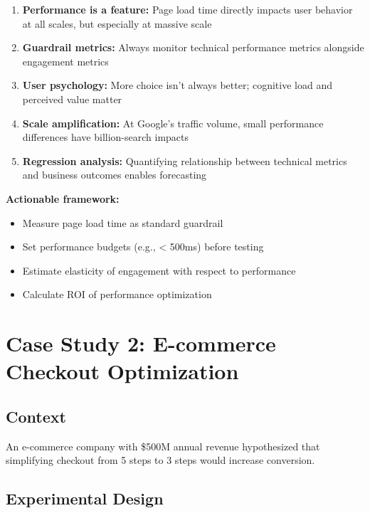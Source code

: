 \begin{enumerate}
    \item \textbf{Performance is a feature:} Page load time directly impacts user behavior at all scales, but especially at massive scale

    \item \textbf{Guardrail metrics:} Always monitor technical performance metrics alongside engagement metrics

    \item \textbf{User psychology:} More choice isn't always better; cognitive load and perceived value matter

    \item \textbf{Scale amplification:} At Google's traffic volume, small performance differences have billion-search impacts

    \item \textbf{Regression analysis:} Quantifying relationship between technical metrics and business outcomes enables forecasting
\end{enumerate}

\textbf{Actionable framework:}
\begin{itemize}
    \item Measure page load time as standard guardrail
    \item Set performance budgets (e.g., < 500ms) before testing
    \item Estimate elasticity of engagement with respect to performance
    \item Calculate ROI of performance optimization
\end{itemize}

\section{Case Study 2: E-commerce Checkout Optimization}

\subsection{Context}

An e-commerce company with \$500M annual revenue hypothesized that simplifying checkout from 5 steps to 3 steps would increase conversion.

\subsection{Experimental Design}

